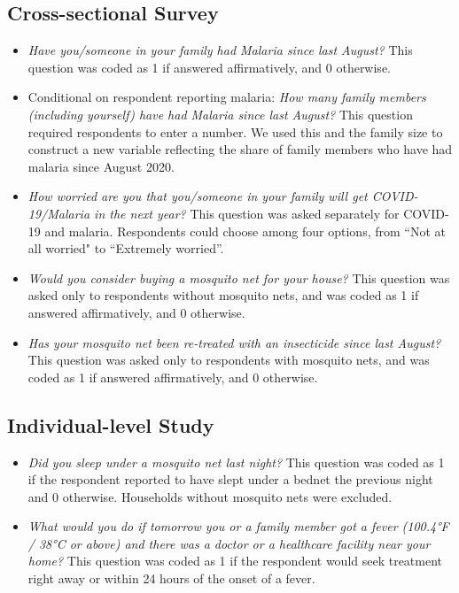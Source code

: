 \subsection{Cross-sectional Survey} 
\begin{itemize}[noitemsep]
    \item[a)] \textit{Have you/someone in your family had Malaria since last August?} This question was coded as 1 if answered affirmatively, and 0 otherwise.
  
    \item[b)] Conditional on respondent reporting malaria: \textit{How many family members (including yourself) have had Malaria since last August?} This question required respondents to enter a number. We used this and the family size to construct a new variable reflecting the share of family members who have had malaria since August 2020.

    \item[c)] \textit{How worried are you that you/someone in your family will get COVID-19/Malaria in the next year?} This question was asked separately for COVID-19 and malaria. Respondents could choose among four options, from ``Not at all worried" to ``Extremely worried''.

   \item[d)] \textit{Would you consider buying a mosquito net for your house?} This question was asked only to respondents without mosquito nets, and was coded as 1 if answered affirmatively, and 0 otherwise.
   
   \item[e)] \textit{Has your mosquito net been re-treated with an insecticide since last August?} This question was asked only to respondents with mosquito nets, and was coded as 1 if answered affirmatively, and 0 otherwise. 
\end{itemize}

\subsection{Individual-level Study} 
\begin{itemize}[noitemsep]
    \item[a)] \textit{Did you sleep under a mosquito net last night?} This question was coded as 1 if the
respondent reported to have slept under a bednet the previous night and 0 otherwise. Households without mosquito nets were excluded.

   \item[b)] \textit{What would you do if tomorrow you or a family member got a fever (100.4°F / 38°C or above) and there was a doctor or a healthcare facility near your home?} This question was coded as 1 if the respondent would seek treatment right away or within 24 hours of the onset of a fever.
  \end{itemize}

